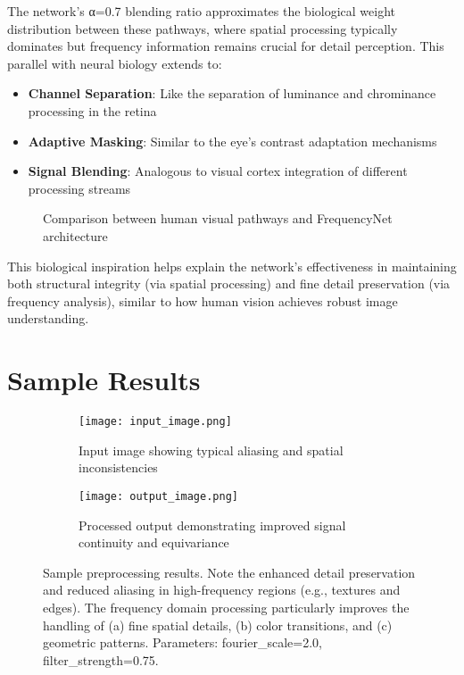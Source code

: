 \documentclass{article}
\begin{document}
The network's α=0.7 blending ratio approximates the biological weight distribution between these pathways, where spatial processing typically dominates but frequency information remains crucial for detail perception. This parallel with neural biology extends to:

\begin{itemize}
\item \textbf{Channel Separation}: Like the separation of luminance and chrominance processing in the retina
\item \textbf{Adaptive Masking}: Similar to the eye's contrast adaptation mechanisms
\item \textbf{Signal Blending}: Analogous to visual cortex integration of different processing streams
\end{itemize}

\begin{figure}[h]
\centering
\begin{tikzpicture}[node distance=2cm]
\end{tikzpicture}
\caption{Comparison between human visual pathways and FrequencyNet architecture}
\label{fig:visual_comparison}
\end{figure}

This biological inspiration helps explain the network's effectiveness in maintaining both structural integrity (via spatial processing) and fine detail preservation (via frequency analysis), similar to how human vision achieves robust image understanding.

\section{Sample Results}
\begin{figure}[htbp]
\centering
\begin{subfigure}[b]{0.45\textwidth}
    \centering
    \texttt{[image: input\_image.png]}
    \caption{Input image showing typical aliasing and spatial inconsistencies}
    \label{fig:input}
\end{subfigure}
\hfill
\begin{subfigure}[b]{0.45\textwidth}
    \centering
    \texttt{[image: output\_image.png]}
    \caption{Processed output demonstrating improved signal continuity and equivariance}
    \label{fig:output}
\end{subfigure}
\caption{Sample preprocessing results. Note the enhanced detail preservation and reduced aliasing in high-frequency regions (e.g., textures and edges). The frequency domain processing particularly improves the handling of (a) fine spatial details, (b) color transitions, and (c) geometric patterns. Parameters: fourier\_scale=2.0, filter\_strength=0.75.}
\label{fig:sample_results}
\end{figure}
\end{document}
